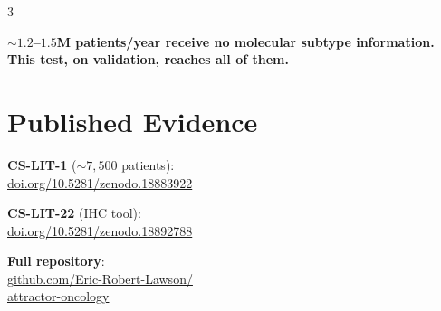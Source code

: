 \documentclass[9pt, a4paper]{article}
\begin{document}
\begin{multicols}{3}
\begin{mdframed}
{\smallskip
\textbf{${\sim}1.2$--$1.5$M patients/year
receive no molecular subtype information.
This test, on validation,
reaches all of them.}}
\end{mdframed}

\section{Published Evidence}

{\small
\textbf{CS-LIT-1}
(${\sim}7{,}500$ patients):\\
\href{https://doi.org/10.5281/zenodo.18883922}
{\scriptsize doi.org/10.5281/zenodo.18883922}

\smallskip
\textbf{CS-LIT-22} (IHC tool):\\
\href{https://doi.org/10.5281/zenodo.18892788}
{\scriptsize doi.org/10.5281/zenodo.18892788}

\smallskip
\textbf{Full repository}:\\
\href{https://github.com/Eric-Robert-Lawson/attractor-oncology}
{\scriptsize github.com/Eric-Robert-Lawson/\\
attractor-oncology}}

\end{multicols}
\end{document}
